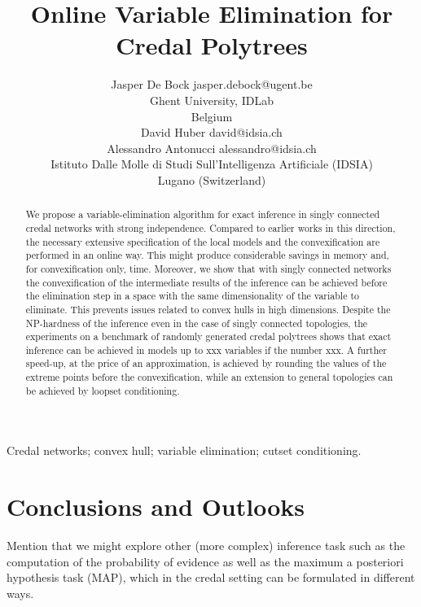 \documentclass[twoside,11pt]{article}
\begin{document}
\title{Online Variable Elimination for Credal Polytrees}
\author{\name Jasper De Bock \email jasper.debock@ugent.be\\
\addr Ghent University, IDLab\\
Belgium\\
\AND
\name David Huber \email david@idsia.ch\\
\name Alessandro Antonucci \email alessandro@idsia.ch\\
\addr Istituto Dalle Molle di Studi Sull'Intelligenza Artificiale (IDSIA)\\
Lugano (Switzerland)}
\maketitle
\begin{abstract}%
We propose a variable-elimination algorithm for exact inference in singly connected credal networks with strong independence. Compared to earlier works in this direction, the necessary extensive specification of the local models and the convexification are performed in an online way. This might produce considerable savings in memory and, for convexification only, time. Moreover, we show that with singly connected networks the convexification of the intermediate results of the inference can be achieved before the elimination step in a space with the same dimensionality of the variable to eliminate. This prevents issues related to convex hulls in high dimensions. Despite the NP-hardness of the inference even in the case of singly connected topologies, the experiments on a benchmark of randomly generated credal polytrees shows that exact inference can be achieved in models up to xxx variables if the number xxx. A further speed-up, at the price of an approximation, is achieved by rounding the values of the extreme points before the convexification, while an extension to general topologies can be achieved by loopset conditioning.
\end{abstract}
\begin{keywords}
Credal networks; convex hull; variable elimination; cutset conditioning.
\end{keywords}





%
\section{Conclusions and Outlooks}
Mention that we might explore other (more complex) inference task such as the computation of the probability of evidence as well as the maximum a posteriori hypothesis task (MAP), which in the credal setting can be formulated in different ways.

\end{document}
